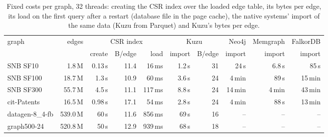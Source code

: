\begin{table}[t]\centering\scriptsize\setlength{\tabcolsep}{2.2pt}
\caption{Fixed costs per graph, 32 threads: creating the CSR index over the loaded edge table, its bytes per edge, its load on the first query after a restart (database file in the page cache), the native systems' import of the same data (Kuzu from Parquet) and Kuzu's bytes per edge.}\label{tab:fixed-costs}
\begin{tabular}{lrrrrrrrrr}\toprule
graph & edges & \multicolumn{3}{c}{CSR index} & \multicolumn{2}{c}{Kuzu} & Neo4j & Memgraph & FalkorDB \\
 & & create & B/edge & load & import & B/edge & import & import & import \\ \midrule
SNB SF10 & 1.8\,M & 0.13\,s & 11.4 & 16\,ms & 1.2\,s & 31 & 24\,s & 6.8\,s & 85\,s \\
SNB SF100 & 18.7\,M & 1.3\,s & 10.9 & 60\,ms & 3.6\,s & 24 & 4\,min & 89\,s & 15\,min \\
SNB SF300 & 55.7\,M & 4.5\,s & 11.1 & 117\,ms & 8.8\,s & 24 & 14\,min & 4\,min & 43\,min \\
cit-Patents & 16.5\,M & 0.98\,s & 17.1 & 54\,ms & 2.8\,s & 24 & 4\,min & 88\,s & 13\,min \\
datagen-8\_4-fb & 539.0\,M & 60\,s & 11.6 & 856\,ms & 69\,s & 16 & -- & -- & -- \\
graph500-24 & 520.8\,M & 50\,s & 12.9 & 939\,ms & 68\,s & 18 & -- & -- & -- \\
\bottomrule\end{tabular}\end{table}
